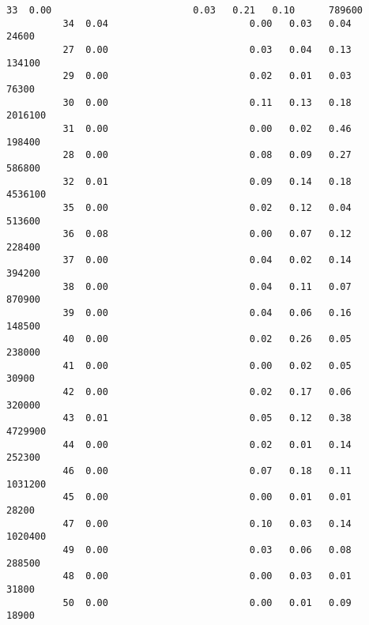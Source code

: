 \documentclass[11pt]{article}
\begin{document}
\begin{Verbatim}[commandchars=\\\{\}]
          33  0.00                         0.03   0.21   0.10      789600                 
          34  0.04                         0.00   0.03   0.04      24600                  
          27  0.00                         0.03   0.04   0.13      134100                 
          29  0.00                         0.02   0.01   0.03      76300                  
          30  0.00                         0.11   0.13   0.18      2016100                
          31  0.00                         0.00   0.02   0.46      198400                 
          28  0.00                         0.08   0.09   0.27      586800                 
          32  0.01                         0.09   0.14   0.18      4536100                
          35  0.00                         0.02   0.12   0.04      513600                 
          36  0.08                         0.00   0.07   0.12      228400                 
          37  0.00                         0.04   0.02   0.14      394200                 
          38  0.00                         0.04   0.11   0.07      870900                 
          39  0.00                         0.04   0.06   0.16      148500                 
          40  0.00                         0.02   0.26   0.05      238000                 
          41  0.00                         0.00   0.02   0.05      30900                  
          42  0.00                         0.02   0.17   0.06      320000                 
          43  0.01                         0.05   0.12   0.38      4729900                
          44  0.00                         0.02   0.01   0.14      252300                 
          46  0.00                         0.07   0.18   0.11      1031200                
          45  0.00                         0.00   0.01   0.01      28200                  
          47  0.00                         0.10   0.03   0.14      1020400                
          49  0.00                         0.03   0.06   0.08      288500                 
          48  0.00                         0.00   0.03   0.01      31800                  
          50  0.00                         0.00   0.01   0.09      18900                  
          

\end{Verbatim}
\end{document}
